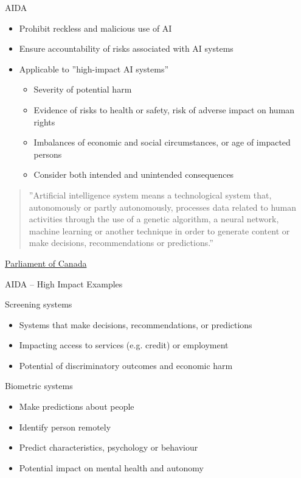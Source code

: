 \documentclass[ignorenonframetext,xcolor=x11names]{beamer}
\begin{document}
\begin{frame}{AIDA}
  \begin{itemize}
     \item Prohibit reckless and malicious use of AI
     \item Ensure accountability of risks associated with AI systems
     \item Applicable to ''high-impact AI systems''
     \begin{itemize} 
        \item Severity of potential harm
        \item Evidence of risks to health or safety, risk of adverse impact on human rights
        \item Imbalances of economic and social circumstances, or age of impacted persons
        \item Consider both intended and unintended consequences
     \end{itemize}
  \end{itemize}
  
\vspace{\baselineskip}
  \begin{quote}''Artificial intelligence system means a technological system that, autonomously or partly autonomously, processes data related to human activities through the use of a genetic algorithm, a neural network, machine learning or another technique in order to generate content or make decisions, recommendations or predictions.''\end{quote} \scriptsize \href{https://www.parl.ca/legisinfo/en/bill/44-1/c-27}{Parliament of Canada}

\end{frame}

\begin{frame}{AIDA -- High Impact Examples}
  \begin{block}{Screening systems}
  \begin{itemize}
     \item Systems that make decisions, recommendations, or predictions
     \item Impacting access to services (e.g. credit) or employment
     \item Potential of discriminatory outcomes and economic harm
  \end{itemize}
  \end{block}
  
  \begin{block}{Biometric systems}
  \begin{itemize}
     \item Make predictions about people
     \item Identify person remotely
     \item Predict characteristics, psychology or behaviour
     \item Potential impact on mental health and autonomy
  \end{itemize}
  \end{block}
\end{frame}
\end{document}
